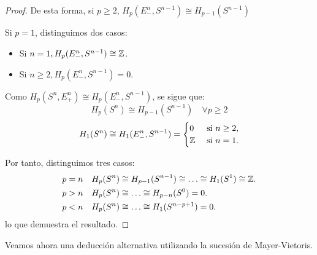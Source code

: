 \begin{proof}
  De esta forma, si $p \geq 2$, $H_p(E_-^n, S^{n-1}) \cong H_{p-1}(S^{n-1})$

  Si $p = 1$, distinguimos dos casos:

  \begin{itemize}
    \item Si $n = 1, H_p(E_-^n, S^{n-1}) \cong \mathbb{Z}$.
    \item Si $n \geq 2, H_p(E_-^n, S^{n-1}) = 0$.
  \end{itemize}

  Como $H_p(S^n, E_+^n) \cong H_p(E_-^n, S^{n-1})$, se sigue que:
  \[ H_p(S^n) \cong H_{p-1}(S^{n-1}) \quad \forall p \geq 2 \]
  \[ H_1(S^n) \cong H_1(E_-^n, S^{n-1}) = \begin{cases} 0 &\text{ si } n \geq 2, \\ \mathbb{Z} &\text{ si } n = 1. \end{cases} \]

  Por tanto, distinguimos tres casos:
  \begin{align*}
      p = n &\quad H_p(S^n) \cong H_{p-1}(S^{n-1}) \cong \dots \cong H_1(S^1) \cong \mathbb{Z}. \\
      p > n &\quad H_p(S^n) \cong \dots \cong H_{p-n}(S^0) = 0. \\
      p < n &\quad H_p(S^n) \cong \dots \cong H_1(S^{n-p+1}) = 0.
  \end{align*}
  lo que demuestra el resultado.
\end{proof}

Veamos ahora una deducción alternativa utilizando la sucesión de Mayer-Vietoris.

